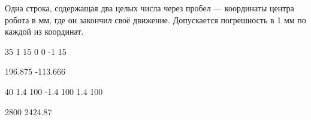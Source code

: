 \outputfmtSection


Одна строка, содержащая два целых числа  через пробел  --- координаты центра робота в мм,
где он закончил своё движение.
Допускается погрешность в 1 мм по каждой из координат.

\exampleSection



\begin{myverbbox}[\small]{\vinput}
    35 1 15 0 0 -1 15
\end{myverbbox}
\begin{myverbbox}[\small]{\voutput}
    196.875 -113.666
\end{myverbbox}


\begin{myverbbox}[\small]{\vinput}
    40 1.4 100 -1.4 100 1.4 100
\end{myverbbox}
\begin{myverbbox}[\small]{\voutput}
    2800 2424.87
\end{myverbbox}


